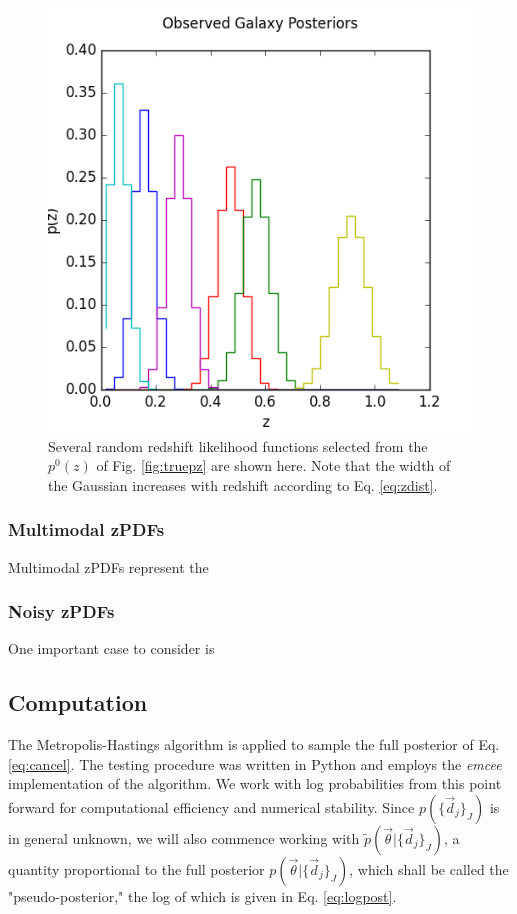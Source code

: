 \documentclass[preprint]{aastex}
\begin{document}
\begin{figure}
\includegraphics[width=\textwidth]{samplepzs.png}
\caption{Several random redshift likelihood functions selected from the $p^{0}(z)$ of Fig. \ref{fig:truepz} are shown here.  Note that the width of the Gaussian increases with redshift according to Eq. \ref{eq:zdist}.}
\label{fig:pzs}
\end{figure}

\subsubsection{Multimodal zPDFs}
\label{sec:multimodal}

Multimodal zPDFs represent the

\subsubsection{Noisy zPDFs}
\label{sec:noisy}

One important case to consider is 

\subsection{Computation}
\label{sec:mcmc}

The Metropolis-Hastings algorithm is applied to sample the full posterior of Eq. \ref{eq:cancel}.  The testing procedure was written in Python and employs the \textit{emcee} implementation of the algorithm.  \citep{for12}  We work with log probabilities from this point forward for computational efficiency and numerical stability.  Since $p(\{\vec{d}_{j}\}_{J})$ is in general unknown, we will also commence working with $\tilde{p}(\vec{\theta}|\{\vec{d}_{j}\}_{J})$, a quantity proportional to the full posterior $p(\vec{\theta}|\{\vec{d}_{j}\}_{J})$, which shall be called the "pseudo-posterior," the log of which is given in Eq. \ref{eq:logpost}.
\end{document}
